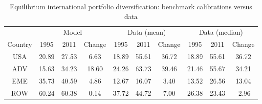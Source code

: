 \begin{table}[p]
\begin{center}
\caption{Equilibrium international portfolio diversification: benchmark calibrations versus data}
\label{tab:results-bal-div-bench-data}
\small
\begin{tabular}{cccccccccc}
\toprule
& \multicolumn{3}{c}{Model} & \multicolumn{3}{c}{Data (mean)} & \multicolumn{3}{c}{Data (median)}\\
\cmidrule(rl){2-4}\cmidrule(rl){5-7}\cmidrule(rl){8-10}
Country & 1995 & 2011 & Change & 1995 & 2011 & Change & 1995 & 2011 & Change\\
\midrule
USA&20.89&27.53&6.63&18.89&55.61&36.72&18.89&55.61&36.72\\
ADV&15.63&34.23&18.60&24.26&63.73&39.46&21.46&55.67&34.21\\
EME&35.73&40.59&4.86&12.67&16.07&3.40&13.52&26.56&13.04\\
ROW&60.24&60.38&0.14&37.72&44.72&7.00&26.38&23.43&-2.96\\
\bottomrule
\end{tabular}
\normalsize
\end{center}
\end{table}
